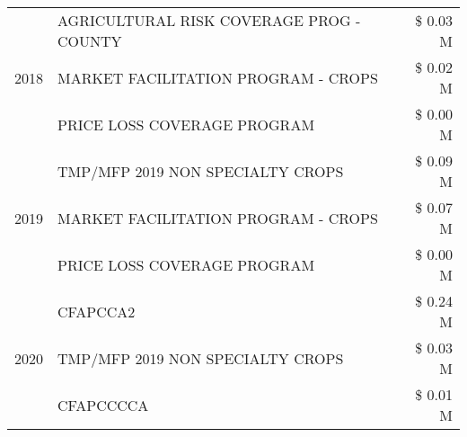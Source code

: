 \begin{tabular}{llr}
\cline{1-3}
\multirow[t]{3}{*}{2018} & AGRICULTURAL RISK COVERAGE PROG - COUNTY & \$ 0.03 M \\
 & MARKET FACILITATION PROGRAM - CROPS & \$ 0.02 M \\
 & PRICE LOSS COVERAGE PROGRAM & \$ 0.00 M \\
\cline{1-3}
\multirow[t]{3}{*}{2019} & TMP/MFP 2019 NON SPECIALTY CROPS & \$ 0.09 M \\
 & MARKET FACILITATION PROGRAM - CROPS & \$ 0.07 M \\
 & PRICE LOSS COVERAGE PROGRAM & \$ 0.00 M \\
\cline{1-3}
\multirow[t]{3}{*}{2020} & CFAPCCA2 & \$ 0.24 M \\
 & TMP/MFP 2019 NON SPECIALTY CROPS & \$ 0.03 M \\
 & CFAPCCCCA & \$ 0.01 M \\
\cline{1-3}
\bottomrule
\end{tabular}
